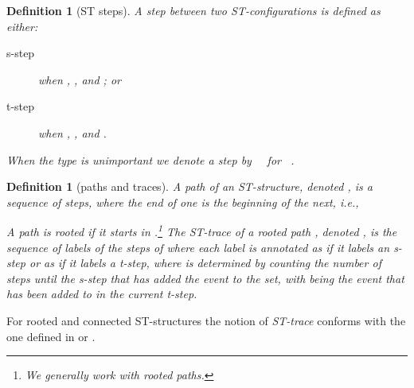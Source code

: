 \documentclass[submission,copyright,creativecommons]{eptcs}
\newtheorem{proposition}[theorem]{Proposition}
\newtheorem{definition}[theorem]{Definition}
\newenvironment{proof}[1][\!\!\,]{\vspace{1ex}\noindent\textbf{Proof #1: }}{\hfill\vspace{2ex}}
\newcommand{\cp}[1]{}
\newcommand\HDAs{\ensuremath{\mathit{HDAs}}}
\newcommand\ST{\ensuremath{\mathsf{ST}}}
\newcommand\ststruct{\ensuremath{\ST}}
\begin{document}
\begin{definition}[ST steps]\label{def_STsteps}
A step between two ST-configurations is defined as either:
\begin{description}
\item[s-step]  when , ,  and ; or
\item[t-step]  when , ,  and .
\end{description}
When the type is unimportant we denote a step by \,  \, for \, .
\end{definition}



\begin{definition}[paths and traces]\label{def_pathstrace}
A \emph{path} of an ST-structure, denoted , is a sequence of steps, where the end of one is the beginning of the next, i.e.,

A path is \emph{rooted} if it starts in .\footnote{We generally work with rooted paths.}
The \emph{ST-trace of a rooted path }, denoted , is the sequence of labels of the steps of  where each label is annotated as  if it labels an s-step or as  if it labels a t-step, where  is determined by counting the number of steps until the s-step that has added the event  to the  set, with  being the event that has been added to  in the current t-step.
\end{definition}

For rooted and connected ST-structures the notion of \emph{ST-trace} conforms with the one defined in \cite[def.2.5]{GlabbeekV97splitting} or \cite[sec.7.3]{Glabbeek06HDA}.

\cp{
\begin{proposition}\label{prop_STtrace}
For a rooted and connected \ststruct\ and a path , the notion of \emph{ST-trace}  
conforms with
the one defined in \cite[def.2.5]{GlabbeekV97splitting} or \cite[sec.7.3]{Glabbeek06HDA}.
\end{proposition}


\begin{proof}
The correspondence that the proposition asserts is based on the correspondence between the respective formalisms in the following sense. Take from \cite[sec.7.3]{Glabbeek06HDA} the definition of ST-trace for higher dimensional automata and take the class of acyclic and non-degenerate \HDAs. The proposition then asserts a correspondence between the definitions of ST-trace in \cite[sec.7.3]{Glabbeek06HDA} for this class and the definition of ST-trace for ST-structures that are rooted, connected and adjacent-free; i.e., . I have denoted by  the function of \cite[sec.7.3]{Glabbeek06HDA} for returning an ST-trace for paths in higher dimensional automata.

The function  is defined on paths  and returning values in , i.e., sequences of labels annotated with natural numbers.
\cp{Finish up this proof and connect it with the pomsets definition also, not only with the HDA.}
\end{proof}
}
\end{document}

